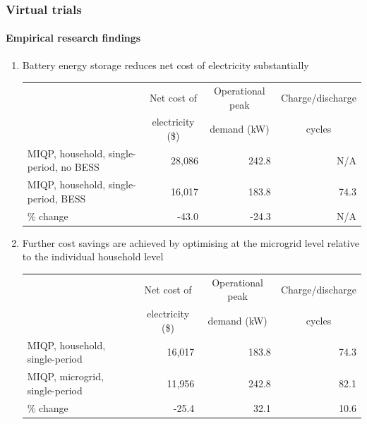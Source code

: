 \documentclass[presentation, smaller, xcolor=table]{beamer}
\newcounter{enumcount}
\begin{document}
\begin{frame}
	\frametitle{Virtual trials}
	\framesubtitle{Empirical research findings}

	\begin{enumerate}
		\item  Battery energy storage reduces net cost of electricity substantially
			\vspace{-0.5em}
			\begin{table}[!h]
			\centering
			{\scriptsize
			\begin{tabular}{l r r r}
				\toprule
				& \multicolumn{1}{c}{Net cost of}	& \multicolumn{1}{c}{Operational peak}	& \multicolumn{1}{c}{Charge/discharge}	\\
				& \multicolumn{1}{c}{	electricity (\$)} 	& \multicolumn{1}{c}{demand (kW)}		&\multicolumn{1}{c}{cycles}	\\
				\midrule
				MIQP, household, single-period, no BESS	& 28,086	& 242.8	& N/A	\\
				MIQP, household, single-period, BESS	& 16,017	& 183.8	& 74.3	\\
				\midrule
				\% change	& -43.0	& -24.3	& N/A	\\
				\bottomrule
			\end{tabular}
			}
			\end{table}
		
		
		\item  Further cost savings are achieved by optimising at the microgrid level relative to the individual household level
			\vspace{0.5em}
			\begin{table}[!h]
			\centering
			{\scriptsize
			\begin{tabular}{l r r r}
				\toprule
				& \multicolumn{1}{c}{Net cost of}	& \multicolumn{1}{c}{Operational peak}	& \multicolumn{1}{c}{Charge/discharge}	\\
				& \multicolumn{1}{c}{	electricity (\$)} 	& \multicolumn{1}{c}{demand (kW)}		&\multicolumn{1}{c}{cycles}	\\
				\midrule
				MIQP, household, single-period		& 16,017	& 183.8	& 74.3	\\
				MIQP, microgrid, single-period		& 11,956	& 242.8	& 82.1	\\
				\midrule
				\% change	& -25.4	& 32.1	& 10.6	\\
				\bottomrule
			\end{tabular}
			}
			\end{table}
			
		\setcounter{enumcount}{\value{enumi}}
	\end{enumerate}

\end{frame}
\end{document}
